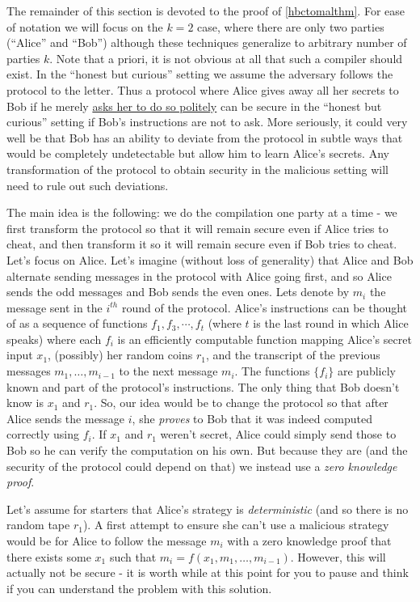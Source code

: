 The remainder of this section is devoted to the proof of
\cref{hbctomalthm}. For ease of notation we will focus on the \(k=2\)
case, where there are only two parties (``Alice'' and ``Bob'') although
these techniques generalize to arbitrary number of parties \(k\). Note
that a priori, it is not obvious at all that such a compiler should
exist. In the ``honest but curious'' setting we assume the adversary
follows the protocol to the letter. Thus a protocol where Alice gives
away all her secrets to Bob if he merely
\href{https://xkcd.com/424/}{asks her to do so politely} can be secure
in the ``honest but curious'' setting if Bob's instructions are not to
ask. More seriously, it could very well be that Bob has an ability to
deviate from the protocol in subtle ways that would be completely
undetectable but allow him to learn Alice's secrets. Any transformation
of the protocol to obtain security in the malicious setting will need to
rule out such deviations.

The main idea is the following: we do the compilation one party at a
time - we first transform the protocol so that it will remain secure
even if Alice tries to cheat, and then transform it so it will remain
secure even if Bob tries to cheat. Let's focus on Alice. Let's imagine
(without loss of generality) that Alice and Bob alternate sending
messages in the protocol with Alice going first, and so Alice sends the
odd messages and Bob sends the even ones. Lets denote by \(m_i\) the
message sent in the \(i^{th}\) round of the protocol. Alice's
instructions can be thought of as a sequence of functions
\(f_1,f_3,\cdots,f_t\) (where \(t\) is the last round in which Alice
speaks) where each \(f_i\) is an efficiently computable function mapping
Alice's secret input \(x_1\), (possibly) her random coins \(r_1\), and
the transcript of the previous messages \(m_1,\ldots,m_{i-1}\) to the
next message \(m_i\). The functions \(\{ f_i \}\) are publicly known and
part of the protocol's instructions. The only thing that Bob doesn't
know is \(x_1\) and \(r_1\). So, our idea would be to change the
protocol so that after Alice sends the message \(i\), she \emph{proves}
to Bob that it was indeed computed correctly using \(f_i\). If \(x_1\)
and \(r_1\) weren't secret, Alice could simply send those to Bob so he
can verify the computation on his own. But because they are (and the
security of the protocol could depend on that) we instead use a
\emph{zero knowledge proof}.

Let's assume for starters that Alice's strategy is \emph{deterministic}
(and so there is no random tape \(r_1\)). A first attempt to ensure she
can't use a malicious strategy would be for Alice to follow the message
\(m_i\) with a zero knowledge proof that there exists some \(x_1\) such
that \(m_i=f(x_1,m_1,\ldots,m_{i-1})\). However, this will actually not
be secure - it is worth while at this point for you to pause and think
if you can understand the problem with this solution.

